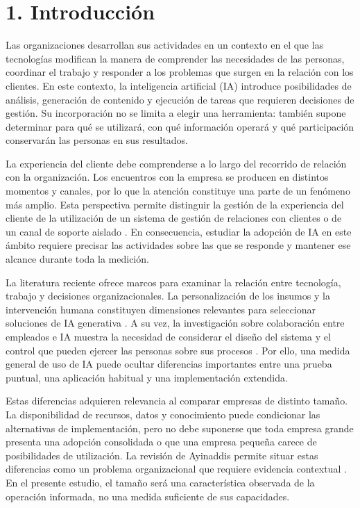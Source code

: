 \documentclass[12pt,letterpaper]{article}
\begin{document}
\section*{1. Introducción}
Las organizaciones desarrollan sus actividades en un contexto en el que las tecnologías modifican la manera de comprender las necesidades de las personas, coordinar el trabajo y responder a los problemas que surgen en la relación con los clientes. En este contexto, la inteligencia artificial (IA) introduce posibilidades de análisis, generación de contenido y ejecución de tareas que requieren decisiones de gestión. Su incorporación no se limita a elegir una herramienta: también supone determinar para qué se utilizará, con qué información operará y qué participación conservarán las personas en sus resultados.

La experiencia del cliente debe comprenderse a lo largo del recorrido de relación con la organización. Los encuentros con la empresa se producen en distintos momentos y canales, por lo que la atención constituye una parte de un fenómeno más amplio. Esta perspectiva permite distinguir la gestión de la experiencia del cliente de la utilización de un sistema de gestión de relaciones con clientes o de un canal de soporte aislado \citep{lemon}. En consecuencia, estudiar la adopción de IA en este ámbito requiere precisar las actividades sobre las que se responde y mantener ese alcance durante toda la medición.

La literatura reciente ofrece marcos para examinar la relación entre tecnología, trabajo y decisiones organizacionales. La personalización de los insumos y la intervención humana constituyen dimensiones relevantes para seleccionar soluciones de IA generativa \citep{grewal}. A su vez, la investigación sobre colaboración entre empleados e IA muestra la necesidad de considerar el diseño del sistema y el control que pueden ejercer las personas sobre sus procesos \citep{blaurock}. Por ello, una medida general de uso de IA puede ocultar diferencias importantes entre una prueba puntual, una aplicación habitual y una implementación extendida.

Estas diferencias adquieren relevancia al comparar empresas de distinto tamaño. La disponibilidad de recursos, datos y conocimiento puede condicionar las alternativas de implementación, pero no debe suponerse que toda empresa grande presenta una adopción consolidada o que una empresa pequeña carece de posibilidades de utilización. La revisión de Ayinaddis permite situar estas diferencias como un problema organizacional que requiere evidencia contextual \citep{ayinaddis}. En el presente estudio, el tamaño será una característica observada de la operación informada, no una medida suficiente de sus capacidades.
\end{document}
